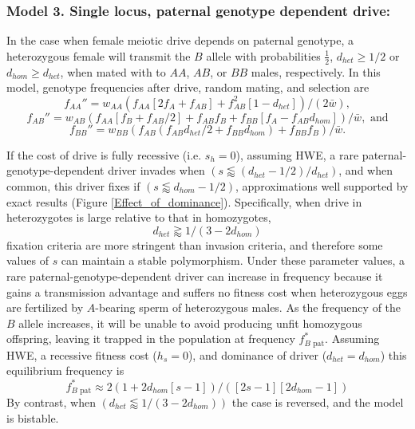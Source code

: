 \documentclass[12pt,letterpaper]{article}
\begin{document}
\subsubsection*{Model 3. Single locus, paternal genotype dependent drive:}
In the case when female meiotic drive depends on paternal genotype,
 a heterozygous female will transmit the $B$ allele 
  with probabilities  $\frac{1}{2}$,  $d_{het}\geq 1/2 $ or $d_{hom}\geq d_{het}$, 
 when mated with to $AA$, $AB$, or $BB$ males,  respectively. 
  In this model, genotype frequencies after drive, random mating, and selection are 
  	$$f_{AA}'' =   w_{AA}\left( f_{AA} [2 f_A + f_{AB} ] + f_{AB}^2 [1 - d_{het}] \right)/(2\bar{w}), $$
	$$f_{AB}'' =   w_{AB}(f_{AA} [f_B + f_{AB}/2] + f_{AB} f_B + f_{BB} [ f_A - f_{AB} d_{hom}])/\bar{w}, \text{ and}$$ 
	$$f_{BB}'' =   w_{BB}(f_{AB} (f_{AB} d_{het}/2 + f_{BB} d_{hom}) + f_{BB} f_B)/\bar{w}.$$ 


If the cost of drive is fully recessive (i.e. $s_h=0$), assuming HWE, 
	a rare paternal-genotype-dependent driver invades when 
	$\left(s\lessapprox \left(d_{het}-1/2\right)/d_{het}\right)$, and when common, this driver fixes if 
	$\left(s\lessapprox d_{hom}-1/2\right)$, approximations well supported by exact results (Figure \ref{Effect_of_dominance}).
Specifically, when drive in heterozygotes is large relative to that in homozygotes, 
	\begin{equation} d_{het}  \gtrapprox 1/(3-2d_{hom}) \label{polymale} \end{equation}
	fixation criteria are more stringent than invasion criteria, 
	and therefore some values of $s$ can maintain a stable polymorphism. 
Under these parameter values, a rare paternal-genotype-dependent driver 
	can increase in frequency because it gains a transmission advantage and suffers 
	no fitness cost when heterozygous eggs are fertilized by 
	$A$-bearing sperm of heterozygous males. 
As the frequency of the $B$ allele increases, 
	it will be unable to 
	avoid producing unfit homozygous offspring, leaving it trapped in
	the population at frequency $f_{B\text{ pat}}^*$. 
Assuming HWE, a recessive fitness cost ($h_s=0$), and dominance of driver ($d_{het}=d_{hom}$) this equilibrium frequency is
\begin{equation}f_{B\text{ pat}}^*\approx2 (1 + 2d_{hom}[s - 1])/([2 s - 1][2d_{hom}- 1]) \label{eqmale} \end{equation}
By contrast, when $\left(d_{het} \lessapprox 1/\left(3-2d_{hom}\right)\right)$ the case is reversed, and the model is bistable.
\end{document}
